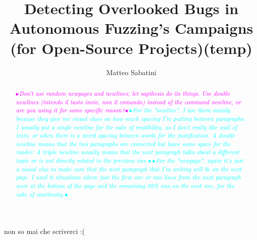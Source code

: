 \documentclass[binding=0.6cm, oneside]{sapthesis}%
\title{Detecting Overlooked Bugs in Autonomous Fuzzing's Campaigns (for Open-Source Projects)(temp)}
\author{Matteo Sabatini}
\newcommand{\mytext}[2]{\textcolor{#1}{#2}}
\newcommand{\mynote}[2]{\xspace\fbox{\bfseries\sffamily\scriptsize{#1}}
	{\small$\blacktriangleright$\textsf{\scriptsize\emph{#2}}$\blacktriangleleft$}}
\newcommand{\matteo}[1]{\mytext{magenta}{\mynote{MM}{#1}}}
\newcommand{\ziosaba}[1]{\mytext{cyan}{\mynote{ZS}{#1}}}
\begin{document}
\setlength{\parindent}{0pt}    %
\frontmatter
\maketitle

\begin{acknowledgments}
non so mai che scriverci :(
\end{acknowledgments}


\begin{abstract}
\matteo{Don't use random newpages and newlines; let sapthesis do its things. Use double newlines (intendo il tasto invio, non il comando) instead of the command newline, or are you using it for some specific reason?}
\ziosaba{For the "newline", I use them mainly because they give me visual clues on how much spacing I'm putting between paragraphs. I usually put a single newline for the sake of readibility, as I don't really like wall of texts, or when there is a weird spacing between words for the justification. A double newline means that the two paragraphs are connected but leave some space for the reader. A triple newline usually means that the next paragraph talks about a different topic or is not directly related to the previous one.}
\ziosaba{For the "newpage", again it's just a visual clue to make sure that the next paragraph that I'm writing will be on the next page. I used it situations where just the first one or two lines from the next paragraph were at the bottom of the page and the remaining 99\% was on the next one, for the sake of continuity.}
\end{abstract}




\tableofcontents


\titleformat{\chapter}[display]  
{\normalfont\Huge\bfseries}{\chaptertitlename\ \thechapter}{20pt}{\huge}  
\titlespacing{\chapter}{0pt}{0pt}{0pt}  

\mainmatter
















\backmatter
{}

\end{document}
